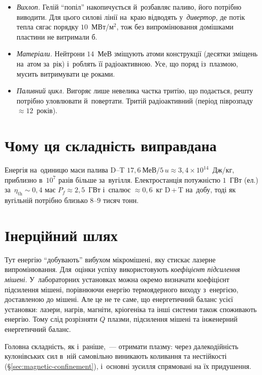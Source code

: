 \begin{itemize}
	\item \emph{Вихлоп.} Гелій \enquote{попіл} накопичується й~розбавляє паливо, його
	  потрібно виводити. Для цього силові лінії на~краю відводять у~\emph{дивертор}, де
	  потік тепла сягає порядку $10$~МВт/м$^2$, тож без випромінювання домішками пластини
	  не витримали б.
	\item \emph{Матеріали.} Нейтрони $14$~МеВ зміщують атоми конструкції (десятки зміщень
	  на~атом за~рік) і~роблять її радіоактивною. Усе, що поряд із~плазмою, мусить
	  витримувати це роками.
	\item \emph{Паливний цикл.} Вигоряє лише невелика частка тритію, що подається, решту
	  потрібно уловлювати й~повертати. Тритій радіоактивний (період піврозпаду
	  $\approx12$~років).
\end{itemize}



\section{Чому ця складність виправдана}



Енергія на~одиницю маси палива D--T
$17{,}6~\text{МеВ}/5\,u\approx3{,}4\times10^{14}$~Дж/кг, приблизно в~$10^{7}$ разів більше
за~вугілля. Електростанція потужністю $1$~ГВт (ел.) за~$\eta_{\mathrm{th}}\sim0{,}4$ має
$P_f\approx2{,}5$~ГВт і~спалює $\approx0{,}6$~кг D\,+\,T на~добу, тоді як вугільній
потрібно близько $8$--$9$ тисяч тонн.



\section{Інерційний шлях}



Тут енергію \enquote{добувають} вибухом мікромішені, яку стискає лазерне випромінювання.
Для~оцінки успіху використовують \emph{коефіцієнт підсилення мішені}. У~лабораторних
установках можна окремо визначати коефіцієнт підсилення мішені, порівнюючи енергію
термоядерного виходу з~енергією, доставленою до мішені. Але це не те саме, що енергетичний
баланс усієї установки: лазери, нагрів, магніти, кріогеніка та інші системи також
споживають енергію. Тому слід розрізняти $Q$ плазми, підсилення мішені та інженерний
енергетичний баланс.

Головна складність, як і~раніше,~--- отримати  плазму: через далекодійність
кулонівських сил в~ній самовільно виникають коливання та нестійкості
(§\ref{sec:magnetic-confinement}), і~основні зусилля спрямовані на їх придушення.




